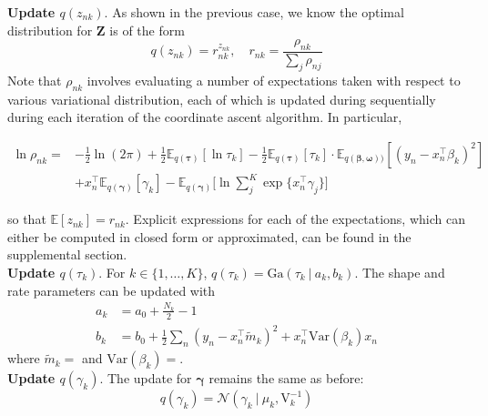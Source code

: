 \documentclass[twoside,11pt]{article}
\newcommand{\tr}{\intercal}
\newcommand\given[1][]{\:#1\vert\:}
\newcommand{\transpose}[1]{#1^{\intercal}}
\newcommand{\nsum}{\sum\limits_{n}}
\newcommand{\boldbeta}{\boldsymbol\beta}
\newcommand{\boldgamma}{\boldsymbol\gamma}
\newcommand{\E}{\mathbb{E}}
\newcommand{\var}[1]{\mathrm{Var}\left(#1\right)}
\begin{document}
\textbf{Update $q \left( z_{nk} \right)$}. As shown in the previous case, we know the optimal distribution for $\mathbf{Z}$ is of the form
$$q(z_{nk}) = r_{nk}^{z_{nk}}, \quad r_{nk} = \frac{\rho_{nk}}{\sum_{j} \rho_{nj}}$$ 
Note that $\rho_{nk}$ involves evaluating a number of expectations taken with respect to various variational distribution, each of which is updated during sequentially during each iteration of the coordinate ascent algorithm. In particular, 

\begin{equation} \label{eq:ln_rho_vs}
\begin{split}
 \ln \rho_{nk} = &-\frac{1}{2}\ln(2\pi) + \frac{1}{2} \E_{q(\boldsymbol\tau)}[ \ln \tau_k ] - \frac{1}{2} \E_{q(\boldsymbol\tau)}[\tau_k] \cdot \E_{q(\boldbeta, \boldsymbol\omega))}[(y_n - x_n^{\tr}\beta_k)^2] \\ 
	& + x_n^{\tr}\E_{q(\boldsymbol\gamma)}[\gamma_k] - \E_{q(\boldsymbol\gamma)}\Bigg[\ln \sum_{j}^K \exp \{ x_n^{\tr} \gamma_j \}\Bigg]
\end{split}
\end{equation}

so that $\E[z_{nk}] = r_{nk}$. Explicit expressions for each of the expectations, which can either be computed in closed form or approximated, can be found in the supplemental section. \\


\textbf{Update $q \left(  \tau_k \right)$}. For $k \in \{1, \ldots, K \}$, $q(\tau_k) = \mathrm{Ga}\left( \tau_k \given a_k, b_k \right)$. The shape and rate parameters can be updated with
\begin{align}
	a_k &= a_0 + \frac{N_k}{2} - 1 \label{eq:ak_vs} \\
	b_k &= b_0 + \frac{1}{2} \nsum (y_n -\transpose{x_n} \tilde{m}_k)^2 + \transpose{x_n}\var{\beta_k} x_n \label{eq:bk_vs}
\end{align}
where $\tilde{m}_k = $ and $\var{\beta_k} = $. \\

\textbf{Update $q \left(  \gamma_k \right)$}. The update for $\boldgamma$ remains the same as before:
\begin{equation} \label{optimal_gmama_vs}
	q(\gamma_k) = \mathcal{N} \left( \gamma_k \given \mu_k, \mathrm{V}_k^{-1} \right)
\end{equation}
\end{document}
